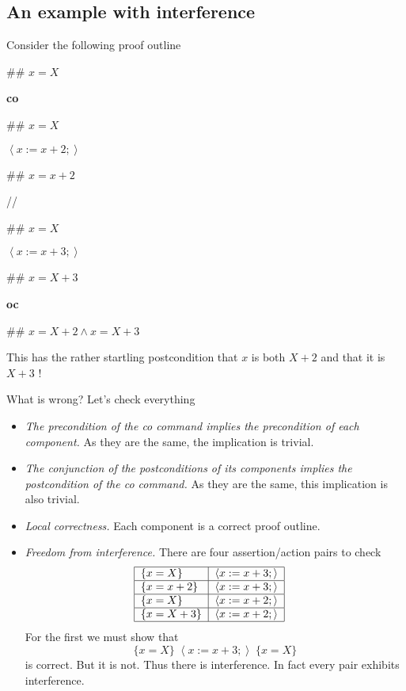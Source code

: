 \documentclass[11pt]{article}%
\begin{document}
\subsection{An example with interference}

Consider the following proof outline

\begin{code}
\#\# $x=X$

\textbf{co}

\begin{indent}
\item \#\# $x=X$

\item $\left\langle x:=x+2;\right\rangle $

\item \#\# $x=x+2$
\end{indent}

//

\begin{indent}
\item \#\# $x=X$

\item $\left\langle x:=x+3;\right\rangle $

\item \#\# $x=X+3$
\end{indent}

\textbf{oc}

\#\# $x=X+2\wedge x=X+3$
\end{code}

This has the rather startling postcondition that $x$ is both $X+2$ and that it
is $X+3$ !

What is wrong? Let's check everything

\begin{itemize}
\item \emph{The precondition of the co command implies the precondition of
each component.} As they are the same, the implication is trivial.

\item \emph{The conjunction of the postconditions of its components implies
the postcondition of the co command.} As they are the same, this implication
is also trivial.

\item \emph{Local correctness.} Each component is a correct proof outline.

\item \emph{Freedom from interference.} There are four assertion/action pairs
to check%
\[%
\begin{tabular}
[c]{|l|l|}\hline
$\{x=X\}$ & $\left\langle x:=x+3;\right\rangle $\\\hline
$\{x=x+2\}$ & $\left\langle x:=x+3;\right\rangle $\\\hline
$\{x=X\}$ & $\left\langle x:=x+2;\right\rangle $\\\hline
$\{x=X+3\}$ & $\left\langle x:=x+2;\right\rangle $\\\hline
\end{tabular}
\ \ \
\]
For the first we must show that%
\[
\{x=X\}\;\left\langle x:=x+3;\right\rangle \;\{x=X\}
\]
is correct. But it is not. Thus there is interference. In fact every pair
exhibits interference.
\end{itemize}
\end{document}

